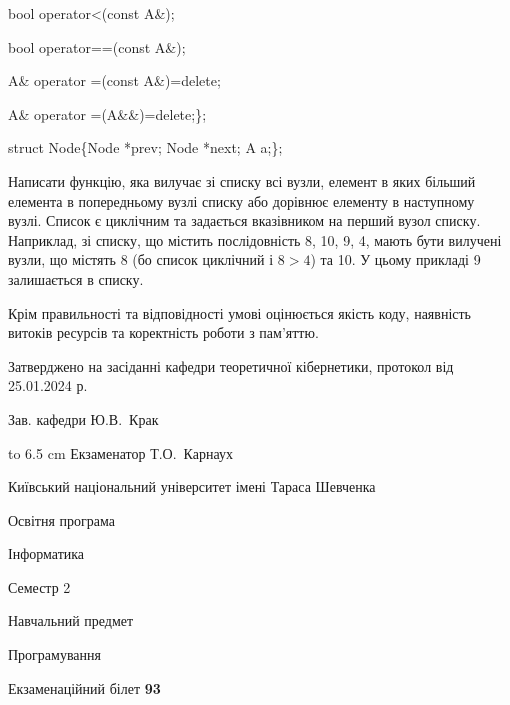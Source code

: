 \documentclass[12pt, ukrainian]{article}
\begin{document}
{\quad  bool operator<(const A\&); 

\quad  bool operator==(const A\&); 

\quad A\& operator =(const A\&)=delete; 

\quad  A\& operator =(A\&\&)=delete;\};

struct Node\{Node *prev; Node *next; A a;\};

Написати функцію, яка вилучає зі списку всі вузли, елемент в яких більший елемента в попередньому вузлі списку або дорівнює елементу в наступному вузлі. Список є циклічним та задається вказівником на перший вузол списку. Наприклад, зі списку, що містить послідовність 8, 10, 9, 4, мають бути вилучені вузли, що містять 8 (бо список циклічний і $8>4$) та 10. У цьому прикладі 9 залишається в списку.

Крім правильності та відповідності умові оцінюється якість коду, наявність витоків ресурсів та коректність роботи з пам'яттю. 

}
{\smallskip\smallskip \begin {scriptsize} Затверджено на засіданні кафедри теоретичної кібернетики, протокол   від   25.01.2024 р.\par\smallskip\smallskip\smallskip\smallskip
{\parbox {6.5 cm} {Зав. кафедри \dotfill Ю.В.~Крак}}\hspace {0.7cm} {\hbox to 6.5 cm { Екзаменатор \dotfill Т.О.~Карнаух}} \end{scriptsize}}
\newpage
{{\begin {scriptsize}\par
{ \center  Київський національний університет імені Тараса Шевченка \par}
{\parbox {5 cm}{Освітня програма \hfill}{\parbox {7 cm}{Інформатика\hfill}}\parbox {6 cm}{\hfill Семестр 2}}\par
{\parbox {5 cm} {Навчальний предмет \hfill}\parbox {7 cm}{Програмування \hfill}\parbox {6cm}{\hfill}\par}\vspace{-15pt} \end{scriptsize}}{\center Екзаменаційний білет \No \textbf { 93 }\par}}
\end{document}
